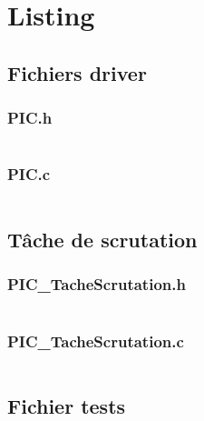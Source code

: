 
\section{Listing}

\subsection{Fichiers driver}

\subsubsection{PIC.h}
\inputminted[tabsize=4,linenos=true,fontsize=\footnotesize,frame=single,resetmargins=true]{c}{\SRCPATH/PIC.h}

\subsubsection{PIC.c}
\inputminted[tabsize=4,linenos=true,fontsize=\footnotesize,frame=single,resetmargins=true]{c}{\SRCPATH/PIC.c}
\pagebreak

\subsection{Tâche de scrutation}

\subsubsection{PIC\_TacheScrutation.h}
\inputminted[tabsize=4,linenos=true,fontsize=\footnotesize,frame=single,resetmargins=true]{c}{\SRCPATH/PIC_TacheScrutation.h}

\subsubsection{PIC\_TacheScrutation.c}
\inputminted[tabsize=4,linenos=true,fontsize=\footnotesize,frame=single,resetmargins=true]{c}{\SRCPATH/PIC_TacheScrutation.c}
\pagebreak

\subsection{Fichier tests}

\inputminted[tabsize=4,linenos=true,fontsize=\footnotesize,frame=single,resetmargins=true]{c}{\SRCPATH/main.c}
\pagebreak


